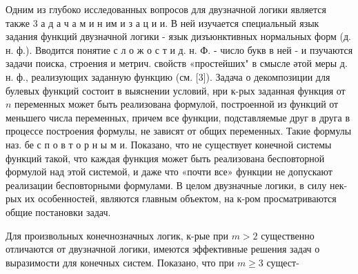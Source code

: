 \documentclass[10pt]{article}
\begin{document}
Одним из глубоко исследованных вопросов для двузначной логики является также 3 а д а ч а м и н им и з а ц и и. В ней изучается специальный язык задания функций двузначной логики - язык дизъюнктивных нормальных форм (д. н. ф.). Вводится понятие с л о ж о с т и д. н. Ф. - число букв в ней - и пзучаются задачи поиска, строения и метрич. свойств «простейших" в смысле әтой меры д. н. ф., реализующих заданную функцию (см. [3]). Задача о декомпозиции для булевых функций состоит в выяснении условий, нри к-рых заданная функция от $n$ переменных может быть реализована формулой, построенной из функций от меньшего числа переменных, причем все функции, подставляемые друг в друга в процессе построения формулы, не зависят от общих переменных. Такие формулы наз. бе с п о в т о р н ы м и. Показано, что не существует конечной системы функций такой, что каждая функция может быть реализована бесповторной формулой над этой системой, и даже что «почти все» функции не допускают реализации бесповторными формулами. В целом двузначные логики, в силу нек-рых их особенностей, являются главным объектом, на к-ром просматриваются общие постановки задач.



Для произвольных конечнозначных логик, к-рые при $m>2$ существенно отличаются от двузначной логики, имеются эффективные решения задач о выразимости для конечных систем. Показано, что при $m \geqslant 3$ сущест-
\end{document}
